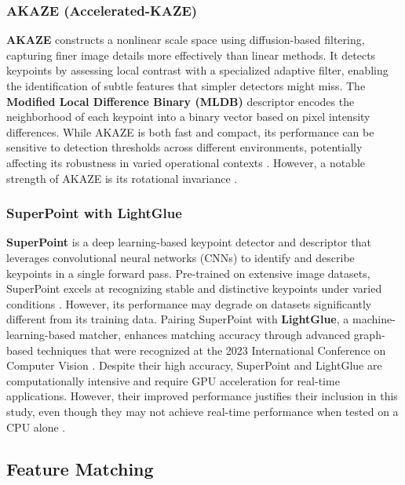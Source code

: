 \subsubsection{AKAZE (Accelerated-KAZE)}

\textbf{AKAZE} constructs a nonlinear scale space using diffusion-based filtering, capturing finer image details more effectively than linear methods. It detects keypoints by assessing local contrast with a specialized adaptive filter, enabling the identification of subtle features that simpler detectors might miss. The \textbf{Modified Local Difference Binary (MLDB)} \cite{reddy2021implementation} descriptor encodes the neighborhood of each keypoint into a binary vector based on pixel intensity differences. While AKAZE is both fast and compact, its performance can be sensitive to detection thresholds across different environments, potentially affecting its robustness in varied operational contexts \cite{opencv_akaze}. However, a notable strength of AKAZE is its rotational invariance \cite{tareen2018comparative}.

\subsubsection{SuperPoint with LightGlue}
\label{sec:SuperPoint with LightGlue}
\textbf{SuperPoint} is a deep learning-based keypoint detector and descriptor that leverages convolutional neural networks (CNNs) to identify and describe keypoints in a single forward pass. Pre-trained on extensive image datasets, SuperPoint excels at recognizing stable and distinctive keypoints under varied conditions \cite{rpaultrat2023superpoint}. However, its performance may degrade on datasets significantly different from its training data. Pairing SuperPoint with \textbf{LightGlue}, a machine-learning-based matcher, enhances matching accuracy through advanced graph-based techniques that were recognized at the 2023 International Conference on Computer Vision \cite{cvg2023lightglue}. Despite their high accuracy, SuperPoint and LightGlue are computationally intensive and require GPU acceleration for real-time applications. However, their improved performance justifies their inclusion in this study, even though they may not achieve real-time performance when tested on a CPU alone \cite{rpaultrat2023superpoint}.




\subsection{Feature Matching}

